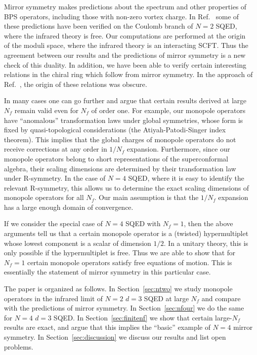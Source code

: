 \documentclass[a4paper,12pt, amsfonts, amssymb]{article}
\begin{document}
Mirror symmetry makes predictions about the spectrum and other properties 
of BPS operators, including those with non-zero vortex charge. 
In Ref.~\cite{five} some of these predictions have been
verified on the Coulomb branch of $N=2$ SQED, where the infrared theory is free. Our computations are performed at the origin of the moduli space, where the infrared theory is an interacting SCFT. Thus the agreement between our 
results and the predictions of mirror symmetry is a new check of this
duality. In addition, we have been able to verify certain interesting
relations in the chiral ring which follow from mirror symmetry.
In the approach of Ref.~\cite{five}, the origin of these relations was
obscure.

In many cases one can go further and argue that certain results derived at large $N_f$ remain valid even for $N_f$ of order one. For example, our
monopole operators have ``anomalous'' transformation laws under global symmetries, whose form is fixed by quasi-topological considerations 
(the Atiyah-Patodi-Singer index theorem). 
This implies that the global charges of monopole operators do not receive corrections at any order in $1/N_f$ expansion. 
Furthermore, since our monopole operators belong
to short representations of the superconformal algebra, their scaling
dimensions are determined by their transformation law under R-symmetry.
In the case of $N=4$ SQED, where it is easy to identify the relevant R-symmetry, this allows us to determine the exact scaling dimensions of monopole operators for all $N_f$. Our main assumption is that the
$1/N_f$ expansion has a large enough domain of convergence.

If we consider the special case of $N=4$ SQED with $N_f=1$, then the 
above arguments tell us that 
a certain monopole operator is a (twisted) hypermultiplet whose lowest
component is a scalar of dimension $1/2$. In a unitary theory, this is only
possible if the hypermultiplet is free. Thus we are able to show
that for $N_f=1$ certain monopole operators satisfy free equations of motion.
This is essentially the statement of mirror symmetry in this 
particular case. 

The paper is organized as follows. In Section~\ref{sec:ntwo} we study monopole
operators in the infrared limit of $N=2$ $d=3$ SQED at large $N_f$ and 
compare with the predictions of mirror symmetry. In Section~\ref{sec:nfour} 
we do the same for $N=4$ $d=3$ SQED. In Section~\ref{sec:finitenf} we show that certain large-$N_f$ results are exact, and argue that this implies the ``basic'' example of $N=4$ mirror symmetry. 
In Section~\ref{sec:discussion} we discuss our results and list open problems. 
\end{document}
